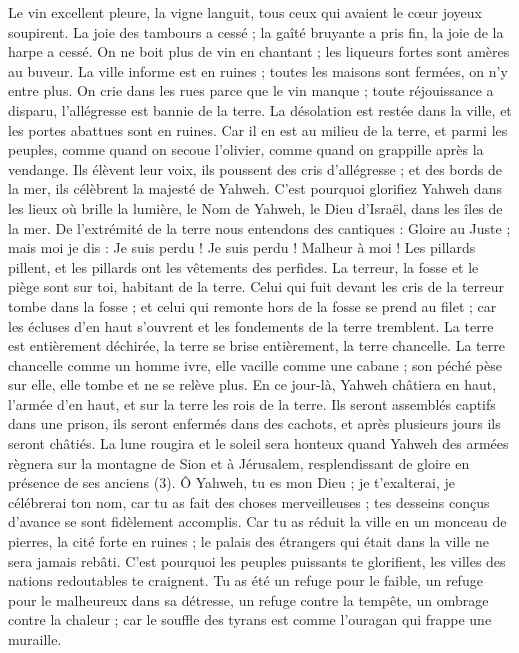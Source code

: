 \begin{multicols}{2}
Le vin excellent pleure, la vigne languit, tous ceux qui avaient le cœur joyeux soupirent.
La joie des tambours a cessé ; la gaîté bruyante a pris fin, la joie de la harpe a cessé.
On ne boit plus de vin en chantant ; les liqueurs fortes sont amères au buveur.
La ville informe est en ruines ; toutes les maisons sont fermées, on n’y entre plus.
On crie dans les rues parce que le vin manque ; toute réjouissance a disparu, l'allégresse est bannie de la terre.
La désolation est restée dans la ville, et les portes abattues sont en ruines.
Car il en est au milieu de la terre, et parmi les peuples, comme quand on secoue l'olivier, comme quand on grappille après la vendange.
Ils élèvent leur voix, ils poussent des cris d’allégresse ; et des bords de la mer, ils célèbrent la majesté de Yahweh.
C'est pourquoi glorifiez Yahweh dans les lieux où brille la lumière, le Nom de Yahweh, le Dieu d'Israël, dans les îles de la mer.
De l’extrémité de la terre nous entendons des cantiques : Gloire au Juste ; mais moi je dis : Je suis perdu ! Je suis perdu ! Malheur à moi ! Les pillards pillent, et les pillards ont les vêtements des perfides.
La terreur, la fosse et le piège sont sur toi, habitant de la terre.
Celui qui fuit devant les cris de la terreur tombe dans la fosse ; et celui qui remonte hors de la fosse se prend au filet ; car les écluses d'en haut s’ouvrent et les fondements de la terre tremblent.
La terre est entièrement déchirée, la terre se brise entièrement, la terre chancelle.
La terre chancelle comme un homme ivre, elle vacille comme une cabane ; son péché pèse sur elle, elle tombe et ne se relève plus.
En ce jour-là, Yahweh châtiera en haut, l'armée d’en haut, et sur la terre les rois de la terre.
Ils seront assemblés captifs dans une prison, ils seront enfermés dans des cachots, et après plusieurs jours ils seront châtiés.
La lune rougira et le soleil sera honteux quand Yahweh des armées règnera sur la montagne de Sion et à Jérusalem, resplendissant de gloire en présence de ses anciens (3).
\VerseOne{}Ô Yahweh, tu es mon Dieu ; je t'exalterai, je célébrerai ton nom, car tu as fait des choses merveilleuses ; tes desseins conçus d’avance se sont fidèlement accomplis.
Car tu as réduit la ville en un monceau de pierres, la cité forte en ruines ; le palais des étrangers qui était dans la ville ne sera jamais rebâti.
C’est pourquoi les peuples puissants te glorifient, les villes des nations redoutables te craignent.
Tu as été un refuge pour le faible, un refuge pour le malheureux dans sa détresse, un refuge contre la tempête, un ombrage contre la chaleur ; car le souffle des tyrans est comme l’ouragan qui frappe une muraille.

\end{multicols}
